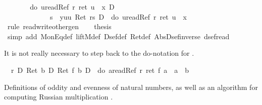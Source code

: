 \begin{isabellebody}
\isamarkupfalse%
\ {\isacharminus}\isanewline
\ \ \isamarkupfalse%
\ {\isachardoublequote}{\isasymturnstile}\ {\isasymUp}\ {\isacharparenleft}do\ {\isacharbraceleft}u{\isasymleftarrow}readRef\ r{\isacharsemicolon}\ ret\ {\isacharparenleft}u\ {\isacharequal}\ x{\isacharparenright}{\isacharbraceright}{\isacharparenright}\ {\isasymlongrightarrow}\isactrlsub D\isanewline
\ \ \ \ \ \ \ \ \ \ \ \ {\isacharbrackleft}{\isacharhash}\ s\ {\isacharcolon}{\isacharequal}\ y{\isacharbrackright}{\isacharparenleft}{\isasymlambda}uu{\isachardot}\ Ret\ {\isacharparenleft}r{\isasymnoteq}s{\isacharparenright}\ {\isasymlongrightarrow}\isactrlsub D\ {\isasymUp}\ {\isacharparenleft}do\ {\isacharbraceleft}u{\isasymleftarrow}readRef\ r{\isacharsemicolon}\ ret\ {\isacharparenleft}u\ {\isacharequal}\ x{\isacharparenright}{\isacharbraceright}{\isacharparenright}{\isacharparenright}{\isachardoublequote}\isanewline
\ \ \ \ \isamarkupfalse%
\ {\isacharparenleft}rule\ read{\isacharunderscore}write{\isacharunderscore}other{\isacharunderscore}gen{\isacharparenright}\isanewline
\ \ \isamarkupfalse%
\ {\isacharquery}thesis\isanewline
\ \ \ \ \isamarkupfalse%
\ {\isacharparenleft}simp\ add{\isacharcolon}\ MonEq{\isacharunderscore}def\ liftM{}{\isacharunderscore}def\ Dsef{\isacharunderscore}def\ Ret{\isacharunderscore}def\ Abs{\isacharunderscore}Dsef{\isacharunderscore}inverse\ dsef{\isacharunderscore}read{\isacharparenright}\isanewline
\isamarkupfalse%
\isamarkupfalse%
%
\begin{isamarkuptext}%
It is not really necessary to step back to the do-notation for 
  .%
\end{isamarkuptext}%
\isamarkuptrue%
\ {\isachardoublequote}{\isasymturnstile}\ {\isacharasterisk}r\ {\isacharequal}\isactrlsub D\ Ret\ b\ {\isasymand}\isactrlsub D\ Ret\ {\isacharparenleft}f\ b{\isacharparenright}\ {\isasymlongrightarrow}\isactrlsub D\ {\isasymUp}\ {\isacharparenleft}do\ {\isacharbraceleft}a{\isasymleftarrow}readRef\ r{\isacharsemicolon}\ ret\ {\isacharparenleft}f\ a\ {\isasymand}\ a\ {\isacharequal}\ b{\isacharparenright}{\isacharbraceright}{\isacharparenright}{\isachardoublequote}\isamarkupfalse%
\isamarkupfalse%
\isamarkupfalse%
\isamarkupfalse%
\isamarkupfalse%
%
\begin{isamarkuptext}%
Definitions of oddity and evenness of natural numbers, as well as an algorithm
  for computing Russian multiplication .

\end{isamarkuptext}
\end{isabellebody}
